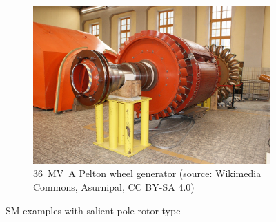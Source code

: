 \begin{frame}
\begin{figure}
		\hfill
		\begin{subfigure}{0.49\textwidth}
			\centering
			\includegraphics[height=0.55\textheight]{fig/lec07/Pelton_wheel_rotor.jpg}
			\caption{\SI[tight-spacing=true]{36}{\mega\volt\ampere} Pelton wheel generator (source: \href{https://commons.wikimedia.org/wiki/File:Wald_am_Arlberg-OeBB_Spullersee_power_plant-M1-Rotor-09ASD.jpg}{Wikimedia Commons},  	Asurnipal, \href{https://creativecommons.org/licenses/by-sa/4.0/deed}{CC BY-SA 4.0})} 
		\end{subfigure}
        \caption{SM examples with salient pole rotor type} 
        \label{fig:examples_SM_applications_01}
	\end{figure}
\end{frame}

